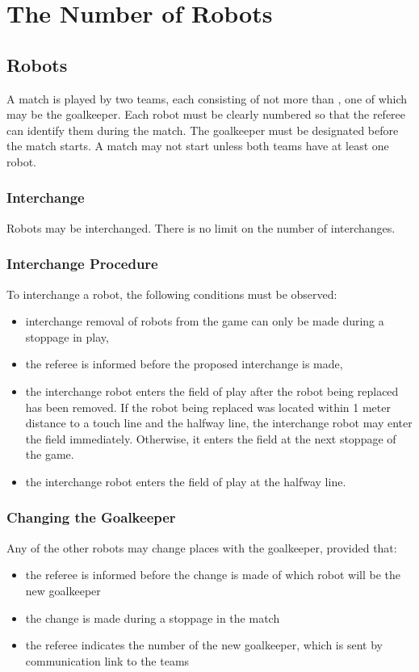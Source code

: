 \section{The Number of Robots}\label{sec:number-of-robots}

\subsection{Robots}
A match is played by two teams, each consisting of not more than  , one of which may be the goalkeeper.
Each robot must be clearly numbered so that the referee can identify them during the match.
The goalkeeper must be designated before the match starts.
A match may not start unless both teams have at least one robot.

\subsubsection{Interchange}\label{subsubsec:number-of-robots-interchange}
Robots may be interchanged.
There is no limit on the number of interchanges.

\subsubsection{Interchange Procedure}
To interchange a robot, the following conditions must be observed:
\begin{itemize}
\item interchange removal of robots from the game can only be made during a stoppage in play,
\item the referee is informed before the proposed interchange is made,
\item the interchange robot enters the field of play after the robot being replaced has been removed.
If the robot being replaced was located within 1 meter distance to a touch line and the halfway line, the interchange robot may enter the field immediately. Otherwise, it enters the field at the next stoppage of the game.
\item the interchange robot enters the field of play at  the halfway line.
\end{itemize}

\subsubsection{Changing the Goalkeeper}
Any of the other robots may change places with the goalkeeper, provided that:
\begin{itemize}
\item the referee is informed before the change is made of which robot will be the new goalkeeper
\item the change is made during a stoppage in the match
\item the referee indicates the number of the new goalkeeper, which is sent by communication link to the teams
\end{itemize}

